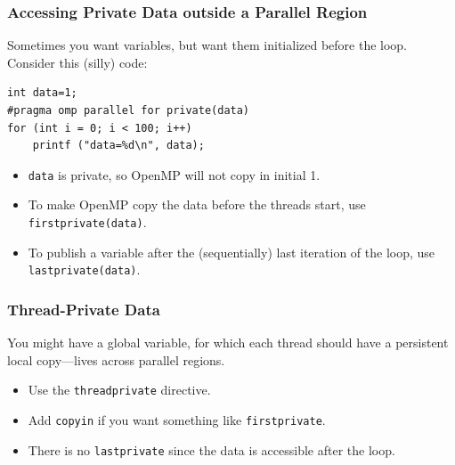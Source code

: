 \begin{frame}[fragile]
  \frametitle{Accessing Private Data outside a Parallel Region}

  
Sometimes you want  variables, but want them initialized
before the loop.\\[1em]

Consider this (silly) code:

\begin{lstlisting}
int data=1;
#pragma omp parallel for private(data)
for (int i = 0; i < 100; i++)
    printf ("data=%d\n", data);
\end{lstlisting}


\begin{itemize}
  \item {\tt data} is private, so OpenMP will not copy in initial 1.
  \item To make OpenMP copy the data before the threads start, use
    {\tt firstprivate(data)}.
  \item To publish a variable after the (sequentially) last iteration of the loop, use
    {\tt lastprivate(data)}.
\end{itemize}
  

\end{frame}

\begin{frame}
  \frametitle{Thread-Private Data}

  

    You might have a global variable, for which each thread should have a persistent local copy---lives across parallel regions.\\[1em]
  \begin{itemize}
    \item Use the {\tt threadprivate} directive.
    \item Add {\tt copyin} if you want something like
      {\tt firstprivate}.
    \item There is no {\tt lastprivate} since the data is accessible after the
      loop.
  \end{itemize}
  

\end{frame}

